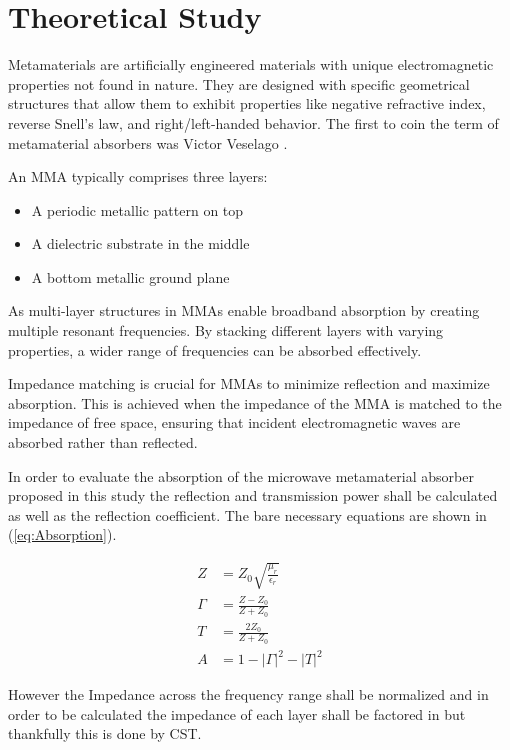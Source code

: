 \section{\textsf{Theoretical Study}}
    Metamaterials are artificially engineered materials with unique electromagnetic properties
    not found in nature. They are designed with specific geometrical structures that allow them
    to exhibit properties like negative refractive index, reverse Snell's law, and right/left-handed
    behavior. The first to coin the term of metamaterial absorbers was Victor Veselago \cite{veselago_left_2006}.
    
    An MMA typically comprises three layers: 
    \begin{itemize}
        \item A periodic metallic pattern on top
        \item A dielectric substrate in the middle
        \item A bottom metallic ground plane
    \end{itemize}
    As multi-layer structures in MMAs enable broadband absorption by creating multiple resonant
    frequencies. By stacking different layers with varying properties, a wider range of 
    frequencies can be absorbed effectively.

    Impedance matching is crucial for MMAs to minimize reflection and maximize absorption. 
    This is achieved when the impedance of the MMA is matched to the impedance of free space,
    ensuring that incident electromagnetic waves are absorbed rather than reflected.

    In order to evaluate the absorption of the microwave metamaterial absorber proposed
    in this study \cite{zhang_design_2023} the reflection and transmission power shall be
    calculated as well as the reflection coefficient. The bare necessary equations are
    shown in (\ref{eq:Absorption}).

    \begin{subequations}
        \label{eq:Absorption}
        \begin{align}
            Z & = Z_0 \sqrt{\frac{\mu_r}{\epsilon_r}} \label{eq:Z} \\
            \Gamma & = \frac{Z - Z_0}{Z + Z_0} \label{eq:ReflectionCoeff} \\
            T & = \frac{2Z_0}{Z + Z_0} \label{eq:TransmissionCoeff} \\
            A & = 1 - |\Gamma|^2 - |T|^2 \label{eq:Absorbance}
        \end{align} 
    \end{subequations}

    However the Impedance across the frequency range shall be normalized and in order to be 
    calculated the impedance of each layer shall be factored in but thankfully this is done
    by CST.